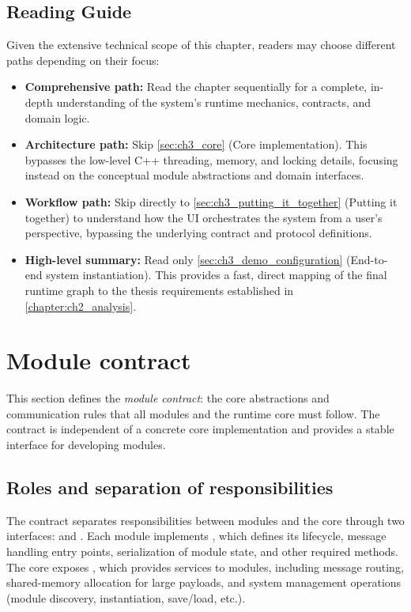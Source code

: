 \subsection{Reading Guide} \label{sec:ch3_reading_guide}

Given the extensive technical scope of this chapter, readers may choose different paths depending on their focus:
\begin{itemize}
    \item \textbf{Comprehensive path:} Read the chapter sequentially for a complete, in-depth understanding of the system's runtime mechanics, contracts, and domain logic.
    \item \textbf{Architecture path:} Skip \autoref{sec:ch3_core} (Core implementation). This bypasses the low-level C++ threading, memory, and locking details, focusing instead on the conceptual module abstractions and domain interfaces.
    \item \textbf{Workflow path:} Skip directly to \autoref{sec:ch3_putting_it_together} (Putting it together) to understand how the UI orchestrates the system from a user's perspective, bypassing the underlying contract and protocol definitions.
    \item \textbf{High-level summary:} Read only \autoref{sec:ch3_demo_configuration} (End-to-end system instantiation). This provides a fast, direct mapping of the final runtime graph to the thesis requirements established in \autoref{chapter:ch2_analysis}.
\end{itemize}



\section{Module contract} \label{sec:ch3_module_contract}

This section defines the \emph{module contract}: the core abstractions and communication rules that all modules and the runtime core must follow. The contract is independent of a concrete core implementation and provides a stable interface for developing modules.

\subsection{Roles and separation of responsibilities} \label{subsec:ch3_roles}

The contract separates responsibilities between modules and the core through two interfaces:  and . Each module implements , which defines its lifecycle, message handling entry points, serialization of module state, and other required methods. The core exposes , which provides services to modules, including message routing, shared-memory allocation for large payloads, and system management operations (module discovery, instantiation, save/load, etc.).

